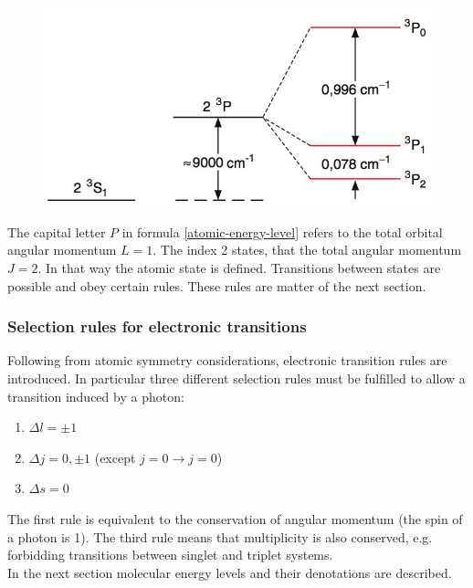 \documentclass[parskip,12pt,headsepline,a4paper] {scrbook}
\begin{document}
\begin{figure}[ht]
\centerline{
\includegraphics[width=12cm]{./spectroscopy/helium-terms.jpg}}
\end{figure}

The capital letter $P$ in formula \ref{atomic-energy-level} refers to the total orbital angular momentum $L = 1$. The index 2 states, that the total angular momentum $J = 2$. In that way the atomic state is defined.
Transitions between states are possible and obey certain rules. These rules are matter of the next section.

\subsubsection{Selection rules for electronic transitions}
\vspace{-1\baselineskip}
Following from atomic symmetry considerations, electronic transition rules are introduced. In particular three different selection rules must be fulfilled to allow a transition induced by a photon:

\begin{enumerate}
\item $\Delta l = \pm 1$
\item $\Delta j = 0, \pm1$ (except $j=0 \rightarrow j=0$)
\item $\Delta s = 0$
\end{enumerate}

The first rule is equivalent to the conservation of angular momentum (the spin of a photon is 1). The third rule means that multiplicity is also conserved, e.g. forbidding transitions between singlet and triplet systems. \\

In the next section molecular energy levels and their denotations are described.
\end{document}
